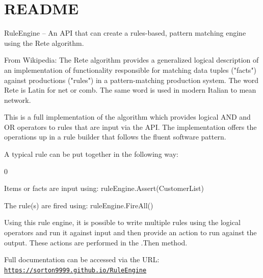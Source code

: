 \chapter{README }
\hypertarget{md__r_e_a_d_m_e}{}\label{md__r_e_a_d_m_e}
Rule\+Engine -- An API that can create a rules-\/based, pattern matching engine using the Rete algorithm.

From Wikipedia:\+ The Rete algorithm provides a generalized logical description of an implementation of functionality responsible for matching data tuples ("{}facts"{}) against productions ("{}rules"{}) in a pattern-\/matching production system. The word \textquotesingle{}Rete\textquotesingle{} is Latin for \textquotesingle{}net\textquotesingle{} or \textquotesingle{}comb\textquotesingle{}. The same word is used in modern Italian to mean \textquotesingle{}network\textquotesingle{}.

This is a full implementation of the algorithm which provides logical AND and OR operators to rules that are input via the API. The implementation offers the operations up in a rule builder that follows the fluent software pattern.

A typical rule can be put together in the following way:\+


\begin{DoxyCode}{0}

\end{DoxyCode}


Items or facts are input using:\+ {\ttfamily rule\+Engine.\+Assert(\+Customer\+List)}

The rule(s) are fired using:\+ {\ttfamily rule\+Engine.\+Fire\+All()}

Using this rule engine, it is possible to write multiple rules using the logical operators and run it against input and then provide an action to run against the output. These actions are performed in the .Then method.

Full documentation can be accessed via the URL:\+ \href{https://sorton9999.github.io/RuleEngine}{\texttt{https:\+/\+/\+sorton9999.\+github.\+io/\+\+Rule\+Engine}} 